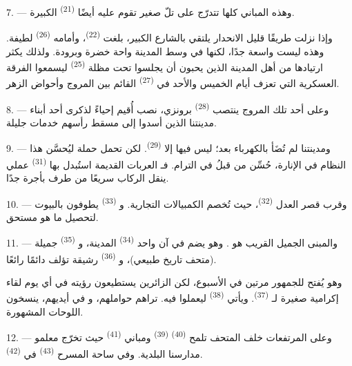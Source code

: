 7. --- وهذه المباني كلها تتدرّج على تلّ صغير تقوم عليه أيضًا
 \textsuperscript{(21)} الكبيرة.

وإذا نزلت طريقًا قليل الانحدار يلتقي بالشارع الكبير، بلغت  \textsuperscript{(22)}، وأمامه  \textsuperscript{(26)} لطيفة.
وهذه  ليست واسعة جدًا، لكنها في وسط المدينة واحة خضرة
وبرودة. ولذلك يكثر ارتيادها من أهل المدينة الذين يحبون أن يجلسوا تحت
مظلة  \textsuperscript{(25)} ليسمعوا الفرقة العسكرية التي تعزف
أيام الخميس والأحد في  \textsuperscript{(27)} القائم بين المروج
وأحواض الزهر.

8. --- وعلى أحد تلك المروج ينتصب  \textsuperscript{(28)} برونزي،
نصب أُقيم إحياءً لذكرى أحد أبناء مدينتنا الذين أسدوا إلى مسقط رأسهم
خدمات جليلة.

\VUsaut{4.0mm}
\VUsaut{3.4mm}

9. --- ومدينتنا لم تُضَأ بالكهرباء بعد؛ ليس فيها إلا 
\textsuperscript{(29)}. لكن  تحمل حملة ليُحسَّن هذا
النظام في الإنارة،  حُسِّن من قبلُ  في
الترام. فـ العربات القديمة 
 استُبدل بها  \textsuperscript{(31)} عملي ينقل
الركاب سريعًا من طرف  بأجرة
 جدًا.

10. --- وقرب قصر العدل  \textsuperscript{(32)}، حيث تُخصم
الكمبيالات التجارية. و \textsuperscript{(33)} يطوفون بالبيوت
لتحصيل ما هو مستحق.

\VUsaut{4.0mm}
\VUsaut{3.4mm}

11. --- والمبنى الجميل القريب هو . وهو يضم في آن واحد
 \textsuperscript{(34)} المدينة، و
\textsuperscript{(35)} جميلة (متحف تاريخ طبيعي)، و
\textsuperscript{(36)} رشيقة تؤلف  دائمًا رائعًا.

وهو يُفتح للجمهور مرتين في الأسبوع، لكن الزائرين يستطيعون رؤيته في أي
يوم لقاء إكرامية صغيرة لـ \textsuperscript{(37)}. ويأتي
 \textsuperscript{(38)} ليعملوا فيه. تراهم 
حواملهم، و في أيديهم، ينسخون اللوحات المشهورة.

12. --- وعلى المرتفعات خلف المتحف تلمح  \textsuperscript{(40)}
 \textsuperscript{(39)} ومباني 
\textsuperscript{(41)} حيث تخرّج معلمو مدارسنا البلدية. وفي ساحة المسرح
 \textsuperscript{(43)} في  \textsuperscript{(42)}.

